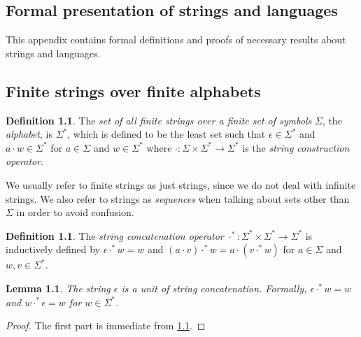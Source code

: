\documentclass{report}
\newtheorem{lemma}[theorem]{Lemma}
\theoremstyle{definition}
\newtheorem{definition}[theorem]{Definition}
\begin{document}
\begin{appendices}


\chapter{Formal presentation of strings and languages}
\label{app.strings_and_langauges}

This appendix contains formal definitions and proofs of necessary results about
strings and languages.

\section{Finite strings over finite alphabets}

\begin{definition} \label{def.star_and_strings}
The \emph{set of all finite strings over a finite set of symbols} $\Sigma$, the
\emph{alphabet}, is $\Sigma^{\ast}$, which is defined to be the least set such that
$\epsilon \in \Sigma^{\ast}$ and $a \cdot w \in \Sigma^{\ast}$ for $a \in \Sigma$
and $w \in \Sigma^{\ast}$ where
$\cdot : \Sigma \times \Sigma^{\ast} \rightarrow \Sigma^{\ast}$ is the
\emph{string construction operator}.

We usually refer to finite strings as just strings, since we do not deal
with infinite strings. We also refer to strings as \emph{sequences} when
talking about sets other than $\Sigma$ in order to avoid confusion.
\end{definition}

\begin{definition} \label{def.string_concatenation}
The \emph{string concatenation operator}
$\cdot^{\ast} : \Sigma^{\ast} \times \Sigma^{\ast} \rightarrow \Sigma^{\ast}$ is
inductively defined by $\epsilon \cdot^{\ast} w = w$ and
$(a \cdot v) \cdot^{\ast} w = a \cdot (v \cdot^{\ast} w)$ for $a \in \Sigma$
and $w, v \in \Sigma^{\ast}$.
\end{definition}

\begin{lemma} \label{lma.string_concatenation_unit}
The string $\epsilon$ is a unit of string concatenation. Formally,
$\epsilon \cdot^{\ast} w = w$ and $w \cdot^{\ast} \epsilon = w$ for
$w \in \Sigma^{\ast}$.
\end{lemma}

\begin{proof}
The first part is immediate from \cref{def.string_concatenation}.


\end{proof}
\end{appendices}
\end{document}

